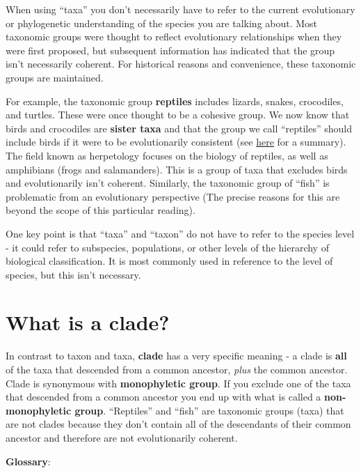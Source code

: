 \documentclass[
]{book}
\begin{document}
When using ``taxa'' you don't necessarily have to refer to the current evolutionary or phylogenetic understanding of the species you are talking about. Most taxonomic groups were thought to reflect evolutionary relationships when they were first proposed, but subsequent information has indicated that the group isn't necessarily coherent. For historical reasons and convenience, these taxonomic groups are maintained.

For example, the taxonomic group \textbf{reptiles} includes lizards, snakes, crocodiles, and turtles. These were once thought to be a cohesive group. We now know that birds and crocodiles are \textbf{sister taxa} and that the group we call ``reptiles'' should include birds if it were to be evolutionarily consistent (see \href{https://en.wikipedia.org/wiki/Reptile\#Phylogenetics_and_modern_definition}{here} for a summary). The field known as herpetology focuses on the biology of reptiles, as well as amphibians (frogs and salamanders). This is a group of taxa that excludes birds and evolutionarily isn't coherent. Similarly, the taxonomic group of ``fish'' is problematic from an evolutionary perspective (The precise reasons for this are beyond the scope of this particular reading).

One key point is that ``taxa'' and ``taxon'' do not have to refer to the species level - it could refer to subspecies, populations, or other levels of the hierarchy of biological classification. It is most commonly used in reference to the level of species, but this isn't necessary.

\hypertarget{what-is-a-clade}{%
\section{What is a clade?}\label{what-is-a-clade}}

In contrast to taxon and taxa, \textbf{clade} has a very specific meaning - a clade is \textbf{all} of the taxa that descended from a common ancestor, \emph{plus} the common ancestor. Clade is synonymous with \textbf{monophyletic group}. If you exclude one of the taxa that descended from a common ancestor you end up with what is called a \textbf{non-monophyletic group}. ``Reptiles'' and ``fish'' are taxonomic groups (taxa) that are not clades because they don't contain all of the descendants of their common ancestor and therefore are not evolutionarily coherent.

\textbf{Glossary}:
\end{document}
